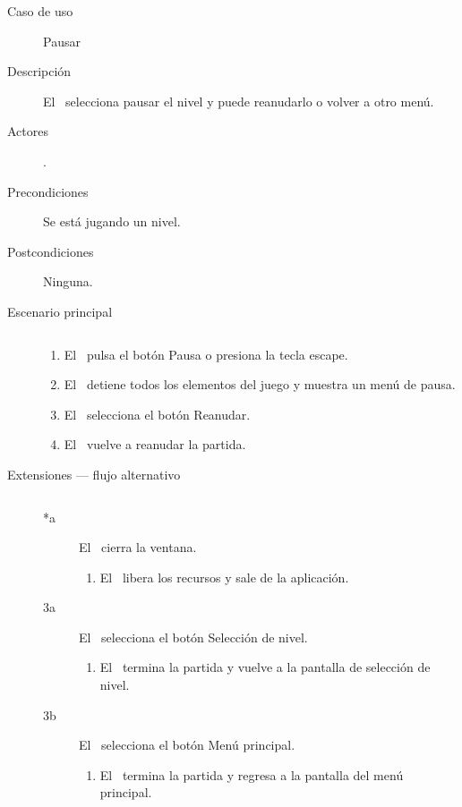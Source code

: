 \begin{description}
    \item [Caso de uso] Pausar
    \item [Descripción] El \jugador\ selecciona pausar el nivel y puede
    reanudarlo o volver a otro menú.
    \item [Actores] \jugador.
    \item [Precondiciones] Se está jugando un nivel.
    \item [Postcondiciones] Ninguna.
    \item [Escenario principal] $\quad$
        \begin{enumerate}
            \item El \jugador\ pulsa el botón Pausa o presiona la tecla
            escape.
            \item El \sistema\ detiene todos los elementos del juego y
            muestra un menú de pausa.
            \item El \jugador\ selecciona el botón Reanudar.
            \item El \sistema\ vuelve a reanudar la partida.
        \end{enumerate}
    \item[Extensiones --- flujo alternativo] $\quad$
        \begin{description}
            \item [*a] El \jugador\ cierra la ventana.
                \begin{enumerate}
                    \item El \sistema\ libera los recursos y sale de la aplicación.
                \end{enumerate}
            \item [3a] El \jugador\ selecciona el botón Selección de nivel.
                \begin{enumerate}
                    \item El \sistema\ termina la partida y vuelve a la pantalla
                    de selección de nivel.
                \end{enumerate}
            \item [3b] El \jugador\ selecciona el botón Menú principal.
                \begin{enumerate}
                    \item El \sistema\ termina la partida y regresa a la
                    pantalla del menú principal.\\
                \end{enumerate}
        \end{description}
    
\end{description}


